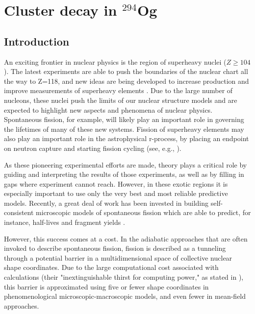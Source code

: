 \chapter{Cluster decay in $^{294}$Og}\label{chap:294Og}

\maketitle
\section{\label{sec:introduction}Introduction}

An exciting frontier in nuclear physics is the region of superheavy nuclei ($Z\geq104$). The latest experiments are able to push the boundaries of the nuclear chart all the way to Z=118, and new ideas are being developed to increase production and improve measurements of superheavy elements \cite{Dmitriev2016,Oganessian2016}. Due to the large number of nucleons, these nuclei push the limits of our nuclear structure models and are expected to highlight new aspects and phenomena of nuclear physics. Spontaneous fission, for example, will likely play an important role in governing the lifetimes of many of these new systems. Fission of superheavy elements may also play an important role in the astrophysical r-process, by placing an endpoint on neutron capture and starting fission cycling (see, e.g., \cite{Giuliani2017}).

As these pioneering experimental efforts are made, theory plays a critical role by guiding and interpreting the results of those experiments, as well as by filling in gaps where experiment cannot reach. However, in these exotic regions it is especially important to use only the very best and most reliable predictive models. Recently, a great deal of work has been invested in building self-consistent microscopic models of spontaneous fission which are able to predict, for instance, half-lives and fragment yields \cite{Sadhukhan2013,Sadhukhan2014,Sadhukhan2016,Sadhukhan2017}.

However, this success comes at a cost. In the adiabatic approaches that are often invoked to describe spontaneous fission, fission is described as a tunneling through a potential barrier in a multidimensional space of collective nuclear shape coordinates. Due to the large computational cost associated with calculations (their "inextinguishable thirst for computing power," as stated in \cite{Schunck2016}), this barrier is approximated using five or fewer shape coordinates in phenomenological microscopic-macroscopic models, and even fewer in mean-field approaches.

